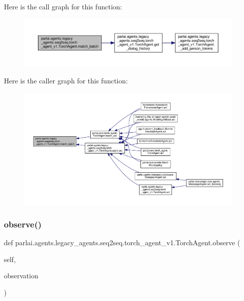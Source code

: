 Here is the call graph for this function\+:
\nopagebreak
\begin{figure}[H]
\begin{center}
\leavevmode
\includegraphics[width=350pt]{classparlai_1_1agents_1_1legacy__agents_1_1seq2seq_1_1torch__agent__v1_1_1TorchAgent_acac419cfad0fc5988e7e796c244f3a9f_cgraph}
\end{center}
\end{figure}
Here is the caller graph for this function\+:
\nopagebreak
\begin{figure}[H]
\begin{center}
\leavevmode
\includegraphics[width=350pt]{classparlai_1_1agents_1_1legacy__agents_1_1seq2seq_1_1torch__agent__v1_1_1TorchAgent_acac419cfad0fc5988e7e796c244f3a9f_icgraph}
\end{center}
\end{figure}
\mbox{\label{classparlai_1_1agents_1_1legacy__agents_1_1seq2seq_1_1torch__agent__v1_1_1TorchAgent_a0eb23a78aea413ae4f90ce0628179920}} 
\subsubsection{\texorpdfstring{observe()}{observe()}}
{\footnotesize\ttfamily def parlai.\+agents.\+legacy\+\_\+agents.\+seq2seq.\+torch\+\_\+agent\+\_\+v1.\+Torch\+Agent.\+observe (\begin{DoxyParamCaption}\item[{}]{self,  }\item[{}]{observation }\end{DoxyParamCaption})}

